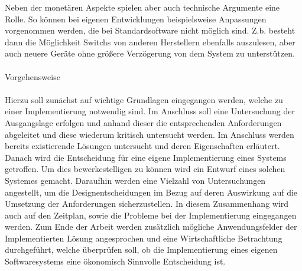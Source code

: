 Neben der monetären Aspekte spielen aber auch technische Argumente eine Rolle.
So können bei eigenen Entwicklungen beispielsweise Anpassungen vorgenommen werden, die bei Standardsoftware nicht möglich sind. Z.b. besteht dann die Möglichkeit Switchs von anderen Herstellern ebenfalls auszulesen, aber auch neuere Geräte ohne größere Verzögerung von dem System zu unterstützen.
\\
\\Vorgehensweise\\
\\
Hierzu soll zunächst auf wichtige Grundlagen eingegangen werden, welche zu einer Implementierung notwendig sind. Im Anschluss soll eine Untersuchung der Ausgangslage erfolgen und anhand dieser die entsprechenden Anforderungen abgeleitet und diese wiederum kritisch untersucht werden. Im Anschluss werden bereits existierende Lösungen untersucht und deren Eigenschaften erläutert. Danach wird die Entscheidung für eine eigene Implementierung eines Systems getroffen. Um dies bewerkestelligen zu können wird ein Entwurf eines solchen Systemes gemacht. Daraufhin werden eine Vielzahl von Untersuchungen angestellt, um die Designentscheidungen im Bezug auf deren Auswirkung auf die Umsetzung der Anforderungen sicherzustellen. In diesem Zusammenhang wird auch auf den Zeitplan, sowie die Probleme bei der Implementierung eingegangen werden.
Zum Ende der Arbeit werden zusätzlich mögliche Anwendungsfelder der Implementierten Lösung angesprochen und eine Wirtschaftliche Betrachtung durchgeführt, welche überprüfen soll, ob die Implementierung eines eigenen Softwaresystems eine ökonomisch Sinnvolle Entscheidung ist.\\